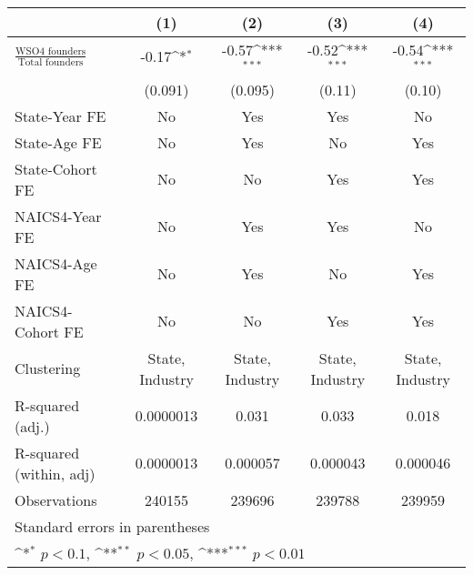 {
\def\sym#1{\ifmmode^{#1}\else\(^{#1}\)\fi}
\begin{tabular}{l*{4}{c}}
\toprule
                    &\multicolumn{1}{c}{(1)}         &\multicolumn{1}{c}{(2)}         &\multicolumn{1}{c}{(3)}         &\multicolumn{1}{c}{(4)}         \\
\midrule
$\frac{\text{WSO4 founders}}{\text{Total founders}}$&       -0.17\sym{*}  &       -0.57\sym{***}&       -0.52\sym{***}&       -0.54\sym{***}\\
                    &     (0.091)         &     (0.095)         &      (0.11)         &      (0.10)         \\
\addlinespace
State-Year FE       &          No         &         Yes         &         Yes         &          No         \\
\addlinespace
State-Age FE        &          No         &         Yes         &          No         &         Yes         \\
\addlinespace
State-Cohort FE     &          No         &          No         &         Yes         &         Yes         \\
\addlinespace
NAICS4-Year FE      &          No         &         Yes         &         Yes         &          No         \\
\addlinespace
NAICS4-Age FE       &          No         &         Yes         &          No         &         Yes         \\
\addlinespace
NAICS4-Cohort FE    &          No         &          No         &         Yes         &         Yes         \\
\midrule
Clustering          &State, Industry         &State, Industry         &State, Industry         &State, Industry         \\
R-squared (adj.)    &   0.0000013         &       0.031         &       0.033         &       0.018         \\
R-squared (within, adj)&   0.0000013         &    0.000057         &    0.000043         &    0.000046         \\
Observations        &      240155         &      239696         &      239788         &      239959         \\
\bottomrule
\multicolumn{5}{l}{\footnotesize Standard errors in parentheses}\\
\multicolumn{5}{l}{\footnotesize \sym{*} \(p<0.1\), \sym{**} \(p<0.05\), \sym{***} \(p<0.01\)}\\
\end{tabular}
}
